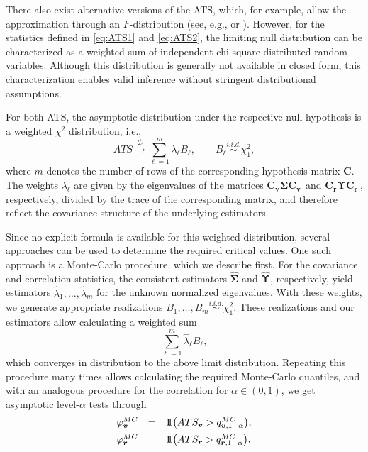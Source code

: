 There also exist alternative versions of the ATS, which, for example, allow the
approximation through an \(F\)-distribution (see, e.g.,
\citet{brunner2019} or \citet{thiel2024}). However, for the statistics
defined in \eqref{eq:ATS1} and \eqref{eq:ATS2}, the limiting null distribution can be characterized as a weighted sum of independent chi-square distributed random variables. Although this distribution is generally not available in closed form, this characterization enables valid inference without stringent distributional assumptions.

For both ATS, the asymptotic distribution under the respective null hypothesis
is a weighted \(\chi^2\) distribution, i.e.,
\begin{equation}
ATS
\stackrel{\mathcal D}{\longrightarrow}
\sum_{\ell=1}^{m} \lambda_\ell B_\ell,
\qquad
B_\ell \stackrel{i.i.d.}{\sim} \chi_1^2,
\label{eq:weighted-limit}
\end{equation}
where \(m\) denotes the number of rows of the corresponding hypothesis matrix
\(\boldsymbol{C}\). The weights \(\lambda_\ell\) are given by the eigenvalues of the matrices
\(\boldsymbol{C}_{\boldsymbol{v}} \boldsymbol{\Sigma} \boldsymbol{C}_{\boldsymbol{v}}^\top\) and
\(\boldsymbol{C}_{\boldsymbol{r}} \boldsymbol{\Upsilon} \boldsymbol{C}_{\boldsymbol{r}}^\top\),
respectively, divided by the trace of the corresponding matrix, and
therefore reflect the covariance structure of the underlying estimators.

Since no explicit formula is available for this weighted distribution, several
approaches can be used to determine the required critical values. One such
approach is a Monte-Carlo procedure, which we describe first. For the covariance and correlation statistics, the consistent estimators
\(\widehat{\boldsymbol{\Sigma}}\) and \(\widehat{\boldsymbol{\Upsilon}}\),
respectively, yield estimators \(\hat{\lambda}_1,\dots,\hat{\lambda}_m\)
for the unknown normalized eigenvalues. With
these weights, we generate appropriate realizations
\(B_1, \dots, B_m \stackrel{i.i.d.}{\sim} \chi_1^2\). These realizations and our
estimators allow calculating a weighted sum
\begin{equation}
\sum_{\ell=1}^{m} \hat{\lambda}_\ell B_\ell,
\label{eq:mc-weighted-sum}
\end{equation}
which converges in distribution to the above limit distribution. Repeating
this procedure many times allows calculating the required Monte-Carlo
quantiles, and with an analogous procedure for the correlation for
\(\alpha \in (0,1)\), we get asymptotic level-\(\alpha\) tests through
\begin{equation}
\begin{array}{lrl}
\varphi_{\boldsymbol{v}}^{MC}
&=&
1\hspace{-0.7ex}1
\bigl(
ATS_{\boldsymbol{v}}
>
q_{\boldsymbol{v}, 1-\alpha}^{MC}
\bigr),
\\[0.5em]
\varphi_{\boldsymbol{r}}^{MC}
&=&
1\hspace{-0.7ex}1
\bigl(
ATS_{\boldsymbol{r}}
>
q_{\boldsymbol{r}, 1-\alpha}^{MC}
\bigr).
\end{array}
\label{eq:mc-tests}
\end{equation}

